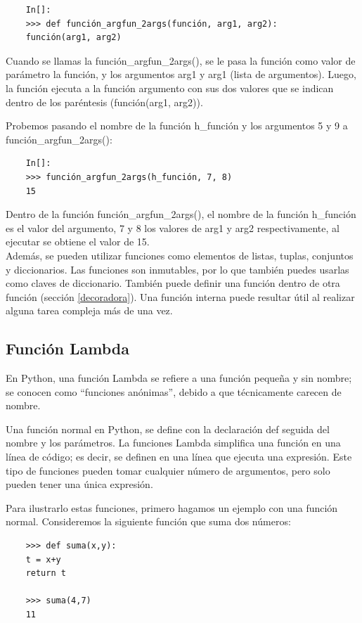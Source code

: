 \begin{lstlisting}
	In[]:	
	>>> def función_argfun_2args(función, arg1, arg2):
	función(arg1, arg2)
\end{lstlisting}

Cuando se llamas la {\ttfamily  función\_argfun\_2args()}, se le pasa la función como valor de parámetro la función, y los argumentos {\ttfamily arg1} y  {\ttfamily arg1} (lista de argumentos). Luego, la función ejecuta a la función argumento con sus dos valores
que se indican dentro de los paréntesis ({\ttfamily función(arg1, arg2)}).

Probemos pasando el nombre de la función {\ttfamily h\_función} y los argumentos 5 y 9 a {\ttfamily  función\_argfun\_2args()}:

\begin{lstlisting}
	In[]:	
	>>> función_argfun_2args(h_función, 7, 8)
	15
\end{lstlisting}

Dentro de la función {\ttfamily  función\_argfun\_2args()}, el nombre de la función {\ttfamily  h\_función} 
es el valor del argumento,  7  y  8 los valores de  {\ttfamily arg1} y {\ttfamily arg2} respectivamente, al ejecutar se obtiene el valor de 15.\\

Además, se pueden utilizar funciones como elementos de listas, tuplas, conjuntos y diccionarios. Las funciones son
inmutables, por lo que también puedes usarlas como claves de diccionario. También puede definir una función dentro de otra función (sección \ref{decoradora}). Una función interna puede resultar útil al realizar alguna tarea compleja más de una vez. 


\subsection{Función Lambda}

En Python, una función Lambda se refiere a una función pequeña y sin nombre; se conocen como  “funciones anónimas”, debido a que técnicamente carecen de nombre.

Una función normal en Python, se define con la declaración {\ttfamily def} seguida del nombre y los parámetros.  La funciones Lambda simplifica una función en una línea de código; es decir, se definen en una línea que ejecuta una expresión. Este tipo de funciones pueden tomar cualquier número de argumentos, pero solo pueden tener una única expresión.

Para ilustrarlo estas funciones, primero hagamos un ejemplo con una función normal. Consideremos la siguiente función que suma dos números:
\begin{lstlisting}
	>>> def suma(x,y):
	t = x+y
	return t
	
	>>> suma(4,7)
	11
\end{lstlisting}

